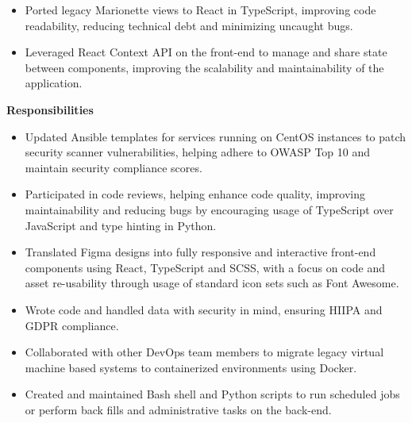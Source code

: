 \documentclass[11pt,a4paper,sans]{moderncv}        %
\begin{document}
{\begin{itemize}
\item Ported legacy Marionette views to React in TypeScript, improving code readability, reducing technical debt and minimizing uncaught bugs.
\item Leveraged React Context API on the front-end to manage and share state between components, improving the scalability and maintainability of the application.
   \end{itemize}
\textbf{Responsibilities}
	\begin{itemize}
\item Updated Ansible templates for services running on CentOS instances to patch security scanner vulnerabilities, helping adhere to OWASP Top 10 and maintain security compliance scores.
\item Participated in code reviews, helping enhance code quality, improving maintainability and reducing bugs by encouraging usage of TypeScript over JavaScript and type hinting in Python.
\item Translated Figma designs into fully responsive and interactive front-end components using React, TypeScript and SCSS, with a focus on code and asset re-usability through usage of standard icon sets such as Font Awesome.
\item Wrote code and handled data with security in mind, ensuring HIIPA and GDPR compliance.
\item Collaborated with other DevOps team members to migrate legacy virtual machine based systems to containerized environments using Docker.
\item Created and maintained Bash shell and Python scripts to run scheduled jobs or perform back fills and administrative tasks on the back-end.
	\end{itemize}
}

\end{document}
